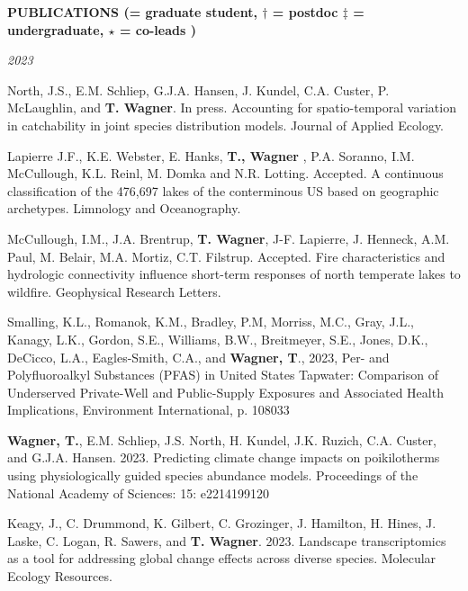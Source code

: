 \documentclass[10pt]{article}
\begin{document}
\begin{flushleft}
\vspace{8pt}
\centerline {\bf{PUBLICATIONS ({\small * = graduate student, $\dagger$ = postdoc $\ddagger$ = undergraduate, $\star$ = co-leads })}}
\vspace{5pt}
\emph{2023}
\begin{etaremune}[start=129]
	
	\item North, J.S., E.M. Schliep, G.J.A. Hansen, J. Kundel, C.A. Custer, P. McLaughlin, and \textbf{T. Wagner}. In press. Accounting for spatio-temporal variation in catchability in joint species distribution models. Journal of Applied Ecology.
	
	\item Lapierre J.F., K.E. Webster, E. Hanks, \textbf{T., Wagner} , P.A. Soranno, I.M. McCullough, K.L. Reinl, M. Domka and N.R. Lotting. Accepted. A continuous classification of the 476,697 lakes of the conterminous US based on geographic archetypes. Limnology and Oceanography. 
	
	\item McCullough, I.M., J.A. Brentrup, \textbf{T. Wagner}, J-F. Lapierre, J. Henneck, A.M. Paul, M. Belair, M.A. Mortiz, C.T. Filstrup. Accepted. Fire characteristics and hydrologic connectivity influence short-term responses of north temperate lakes to wildfire. Geophysical Research Letters.
	
	\item Smalling, K.L., Romanok, K.M., Bradley, P.M, Morriss, M.C., Gray, J.L., Kanagy, L.K., Gordon, S.E., Williams, B.W., Breitmeyer, S.E., Jones, D.K., DeCicco, L.A., Eagles-Smith, C.A., and \textbf{Wagner, T}., 2023, Per- and Polyfluoroalkyl Substances (PFAS) in United States Tapwater: Comparison of Underserved Private-Well and Public-Supply Exposures and Associated Health Implications, Environment International, p. 108033
	
\item \textbf{Wagner, T.}, E.M. Schliep, J.S. North, H. Kundel, J.K. Ruzich, C.A. Custer, and G.J.A. Hansen. 2023. Predicting climate change impacts on poikilotherms using physiologically guided species abundance models. Proceedings of the National Academy of Sciences: 15: e2214199120

\item Keagy, J., C. Drummond, K. Gilbert, C. Grozinger, J. Hamilton, H. Hines, J. Laske, C. Logan, R. Sawers, and\textbf{ T. Wagner}. 2023. Landscape transcriptomics as a tool for addressing global change effects across diverse species. Molecular Ecology Resources.


\end{etaremune}
\end{flushleft}
\end{document}

